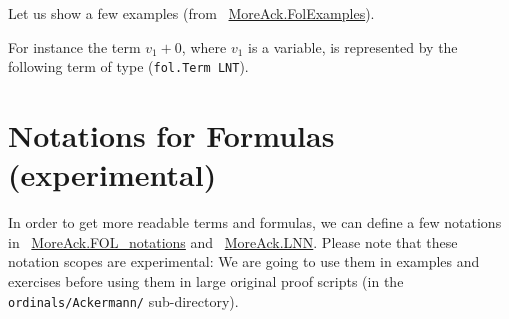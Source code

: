 Let us show a few examples (from ~\href{../theories/html/hydras.MoreAck.FolExamples.html}{MoreAck.FolExamples}).

 
















For instance the term $v_1+0$, where $v_1$ is a variable,
is represented by the following \gallina term of type 
(\texttt{fol.Term LNT}).








\section{Notations for Formulas (experimental)}

In order to get more readable terms and formulas, we can define a few notations in ~\href{../theories/html/hydras.MoreAck.FOL_notations.html}{MoreAck.FOL\_notations} and
~\href{../theories/html/hydras.MoreAck.LNN.html}{MoreAck.LNN}.
Please note that these notation scopes are experimental: We are going to use them in examples and exercises before using them in large original proof scripts (in the \texttt{ordinals/Ackermann/} sub-directory).


